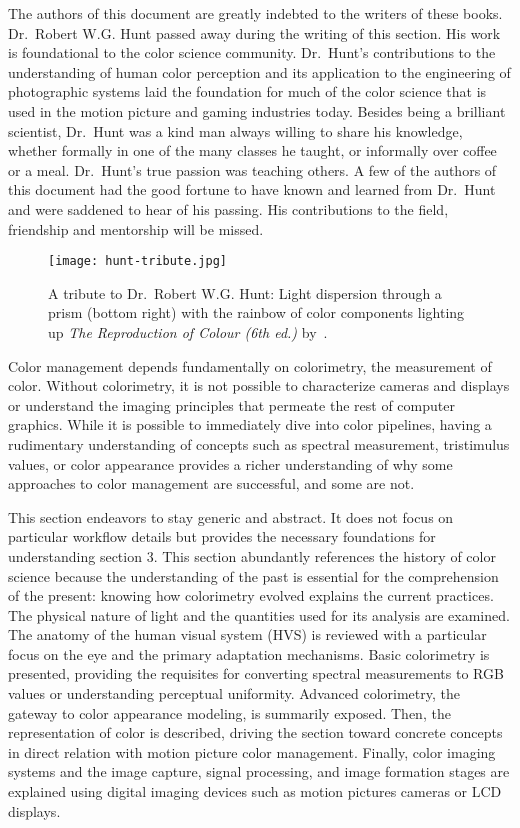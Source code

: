 The authors of this document are greatly indebted to the writers of these
books.
\ccPar{}
Dr.~Robert W.G. Hunt passed away during the writing of this section. His work
is foundational to the color science community. Dr.~Hunt’s contributions to the
understanding of human color perception and its application to the engineering
of photographic systems laid the foundation for much of the color science that
is used in the motion picture and gaming industries today. Besides being a
brilliant scientist, Dr.~Hunt was a kind man always willing to share his
knowledge, whether formally in one of the many classes he taught, or informally
over coffee or a meal. Dr.~Hunt’s true passion was teaching others. A few of
the authors of this document had the good fortune to have known and learned
from Dr.~Hunt and were saddened to hear of his passing. His contributions to
the field, friendship and mentorship will be missed.

\begin{figure}[H]
    \texttt{[image: hunt-tribute.jpg]}
    \caption{
        A tribute to Dr.~Robert W.G. Hunt: Light dispersion through a prism
        (bottom right) with the rainbow of color components lighting up
        \textit{The Reproduction of Colour (6th ed.)} by~\textcite{Hunt2004b}.
    }%
    \label{fig:hunt-tribute}
\end{figure}

Color management depends fundamentally on colorimetry, the measurement of
color. Without colorimetry, it is not possible to characterize cameras and
displays or understand the imaging principles that permeate the rest of
computer graphics. While it is possible to immediately dive into color
pipelines, having a rudimentary understanding of concepts such as spectral
measurement, tristimulus values, or color appearance provides a richer
understanding of why some approaches to color management are successful, and
some are not.

This section endeavors to stay generic and abstract. It does not focus on
particular workflow details but provides the necessary foundations for
understanding section 3. This section abundantly references the history of
color science because the understanding of the past is essential for the
comprehension of the present: knowing how colorimetry evolved explains the
current practices. The physical nature of light and the quantities used for
its analysis are examined. The anatomy of the human visual system (HVS) is
reviewed with a particular focus on the eye and the primary adaptation
mechanisms. Basic colorimetry is presented, providing the requisites for
converting spectral measurements to RGB values or understanding perceptual
uniformity. Advanced colorimetry, the gateway to color appearance modeling, is
summarily exposed. Then, the representation of color is described, driving the
section toward concrete concepts in direct relation with motion picture color
management. Finally, color imaging systems and the image capture, signal
processing, and image formation stages are explained using digital imaging
devices such as motion pictures cameras or LCD displays.

